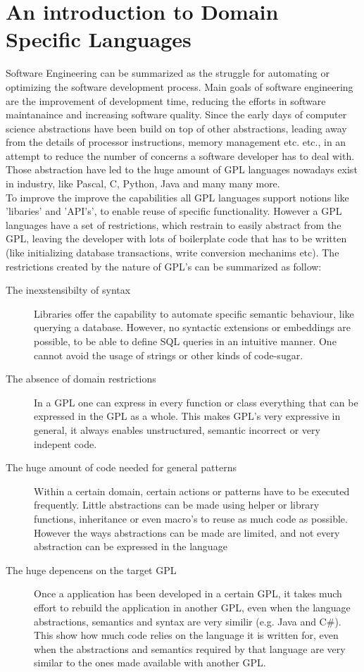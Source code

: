 \section[]{An introduction to Domain Specific Languages}

Software Engineering can be summarized as the struggle for automating or optimizing the software development process. Main goals of software engineering are the improvement of development time, reducing the efforts in software maintanaince and increasing software quality. Since the early days of computer science abstractions have been build on top of other abstractions, leading away from the details of processor instructions, memory management etc. etc., in an attempt to reduce the number of concerns a software developer has to deal with. Those abstraction have led to the huge amount of GPL languages nowadays exist in industry, like Pascal, C, Python, Java and many many more. 
\\
To improve the improve the capabilities all GPL languages support notions like 'libaries' and 'API's', to enable reuse of specific functionality. However a GPL languages have a set of restrictions, which restrain to easily abstract from the GPL, leaving the developer with lots of boilerplate code that has to be written (like initializing database transactions, write conversion mechanims etc). The restrictions created by the nature of GPL's can be summarized as follow:
\\
\begin{description}
	\item[The inexstensibilty of syntax]
	Libraries offer the capability to automate specific semantic behaviour, like querying a database. However, no syntactic extensions or embeddings are possible, to be able to define SQL queries in an intuitive manner. One cannot avoid the usage of strings or other kinds of code-sugar. 
	\item[The absence of domain restrictions]
	In a GPL one can express in every function or class everything that can be expressed in the GPL as a whole. This makes GPL's very expressive in general, it always enables unstructured, semantic incorrect or very indepent code.
	\item[The huge amount of code needed for general patterns]
	Within a certain domain, certain actions or patterns have to be executed frequently. Little abstractions can be made using helper or library functions, inheritance or even macro's to reuse as much code as possible. However the ways abstractions can be made are limited, and not every abstraction can be expressed in the language
	\item[The huge depencens on the target GPL]
	Once a application has been developed in a certain GPL, it takes much effort to rebuild the application in another GPL, even when the language abstractions, semantics and syntax are very similir (e.g. Java and C\#). This show how much code relies on the language it is written for, even when the abstractions and semantics required by that language are very similar to the ones made available with another GPL. 
\end{description}

